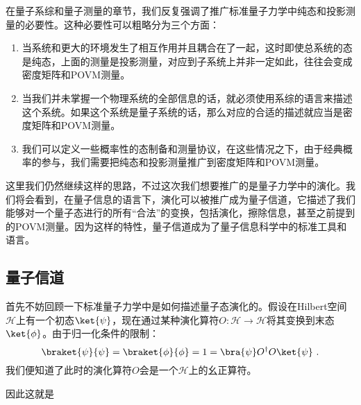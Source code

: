 

在量子系综和量子测量的章节，我们反复强调了推广标准量子力学中纯态和投影测量的必要性。这种必要性可以粗略分为三个方面：
\begin{enumerate}
\item 当系统和更大的环境发生了相互作用并且耦合在了一起，这时即使总系统的态是纯态，上面的测量是投影测量，对应到子系统上并非一定如此，往往会变成密度矩阵和POVM测量。
\item 当我们并未掌握一个物理系统的全部信息的话，就必须使用系综的语言来描述这个系统。如果这个系统是量子系统的话，那么对应的合适的描述就应当是密度矩阵和POVM测量。
\item 我们可以定义一些概率性的态制备和测量协议，在这些情况之下，由于经典概率的参与，我们需要把纯态和投影测量推广到密度矩阵和POVM测量。
\end{enumerate}

这里我们仍然继续这样的思路，不过这次我们想要推广的是量子力学中的演化。我们将会看到，在量子信息的语言下，演化可以被推广成为量子信道，它描述了我们能够对一个量子态进行的所有“合法”的变换，包括演化，擦除信息，甚至之前提到的POVM测量。因为这样的特性，量子信道成为了量子信息科学中的标准工具和语言。

\subsection{量子信道}

首先不妨回顾一下标准量子力学中是如何描述量子态演化的。假设在Hilbert空间$\mathcal{H}$上有一个初态$\ket{\psi}$，现在通过某种演化算符$O:\mathcal{H}\to\mathcal{H}$将其变换到末态$\ket{\phi}$。由于归一化条件的限制：
\begin{equation}
\braket{\psi}{\psi}=\braket{\phi}{\phi}=1=\bra{\psi}O^\dagger O\ket{\psi}~.
\end{equation}
我们便知道了此时的演化算符$O$会是一个$\mathcal{H}$上的幺正算符。

因此这就是